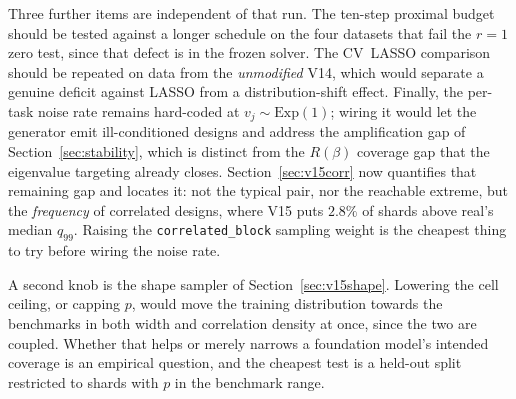 \documentclass[11pt]{article}
\newcommand{\Rq}{R(\beta)}
\begin{document}
Three further items are independent of that run. The ten-step proximal budget
should be tested against a longer schedule on the four datasets that fail the
$r = 1$ zero test, since that defect is in the frozen solver. The CV~LASSO
comparison should be repeated on data from the \emph{unmodified} V14, which
would separate a genuine deficit against LASSO from a distribution-shift
effect. Finally, the per-task noise rate remains hard-coded at
$v_j \sim \mathrm{Exp}(1)$; wiring it would let the generator emit
ill-conditioned designs and address the amplification gap of
Section~\ref{sec:stability}, which is distinct from the $\Rq$ coverage gap that
the eigenvalue targeting already closes. Section~\ref{sec:v15corr} now
quantifies that remaining gap and locates it: not the typical pair, nor the
reachable extreme, but the \emph{frequency} of correlated designs, where V15
puts $2.8\%$ of shards above real's median $q_{99}$. Raising the
\texttt{correlated\_block} sampling weight is the cheapest thing to try before
wiring the noise rate.

A second knob is the shape sampler of Section~\ref{sec:v15shape}. Lowering the
cell ceiling, or capping $p$, would move the training distribution towards the
benchmarks in both width and correlation density at once, since the two are
coupled. Whether that helps or merely narrows a foundation model's intended
coverage is an empirical question, and the cheapest test is a held-out split
restricted to shards with $p$ in the benchmark range.
\end{document}
